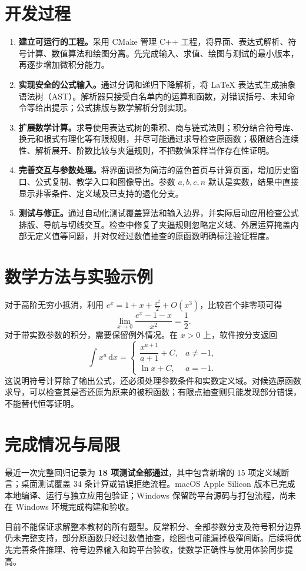 \documentclass[UTF8,a4paper,zihao=-4,fontset=fandol]{ctexart}
\begin{document}
\section{开发过程}
\begin{enumerate}
\item \textbf{建立可运行的工程。}采用 CMake 管理 C++ 工程，将界面、表达式解析、符号计算、数值算法和绘图分离。先完成输入、求值、绘图与测试的最小版本，再逐步增加微积分能力。
\item \textbf{实现安全的公式输入。}通过分词和递归下降解析，将 LaTeX 表达式生成抽象语法树（AST）。解析器只接受白名单内的运算和函数，对错误括号、未知命令等给出提示；公式排版与数学解析分别实现。
\item \textbf{扩展数学计算。}求导使用表达式树的乘积、商与链式法则；积分结合符号库、换元和根式有理化等有限规则，并尽可能通过求导检查原函数；极限结合连续性、解析展开、阶数比较与夹逼规则，不把数值采样当作存在性证明。
\item \textbf{完善交互与参数处理。}将界面调整为简洁的蓝色首页与计算页面，增加历史窗口、公式复制、教学入口和图像导出。参数 $a,b,c,n$ 默认是实数，结果中直接显示非零条件、定义域及已支持的退化分支。
\item \textbf{测试与修正。}通过自动化测试覆盖算法和输入边界，并实际启动应用检查公式排版、导航与切线交互。检查中修复了夹逼规则忽略定义域、外层运算掩盖内部无定义值等问题，并对仅经过数值抽查的原函数明确标注验证程度。
\end{enumerate}
\section{数学方法与实验示例}
对于高阶无穷小抵消，利用
$e^x=1+x+\frac{x^2}{2}+O(x^3)$，比较首个非零项可得
\[
\lim_{x\to0}\frac{e^x-1-x}{x^2}=\frac12.
\]
对于带实数参数的积分，需要保留例外情况。在 $x>0$ 上，软件按分支返回
\[
\int x^a\,\mathrm{d}x=
\begin{cases}
\dfrac{x^{a+1}}{a+1}+C,&a\ne-1,\\[3pt]
\ln x+C,&a=-1.
\end{cases}
\]
这说明符号计算除了输出公式，还必须处理参数条件和实数定义域。对候选原函数求导，可以检查其是否还原为原来的被积函数；有限点抽查则只能发现部分错误，不能替代恒等证明。
\section{完成情况与局限}
最近一次完整回归记录为 \textbf{18 项测试全部通过}，其中包含新增的 15 项定义域断言；桌面测试覆盖 34 条计算或错误拒绝流程。macOS Apple Silicon 版本已完成本地编译、运行与独立应用包验证；Windows 保留跨平台源码与打包流程，尚未在 Windows 环境完成构建和验收。

目前不能保证求解整本教材的所有题型。反常积分、全部参数分支及符号积分边界仍未完整支持，部分原函数只经过数值抽查，绘图也可能漏掉极窄间断。后续将优先完善条件推理、符号边界输入和跨平台验收，使数学正确性与使用体验同步提高。
\end{document}
